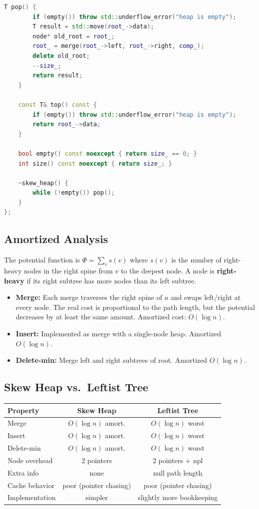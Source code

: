 \begin{lstlisting}[language=C++]
    T pop() {
        if (empty()) throw std::underflow_error("heap is empty");
        T result = std::move(root_->data);
        node* old_root = root_;
        root_ = merge(root_->left, root_->right, comp_);
        delete old_root;
        --size_;
        return result;
    }

    const T& top() const {
        if (empty()) throw std::underflow_error("heap is empty");
        return root_->data;
    }

    bool empty() const noexcept { return size_ == 0; }
    int size() const noexcept { return size_; }

    ~skew_heap() {
        while (!empty()) pop();
    }
};
\end{lstlisting}

\subsection{Amortized Analysis}

The potential function is $\Phi = \sum_v s(v)$ where $s(v)$ is the number of right-heavy nodes in the right spine from $v$ to the deepest node. A node is \textbf{right-heavy} if its right subtree has more nodes than its left subtree.

\begin{itemize}
\item \textbf{Merge:} Each merge traverses the right spine of $a$ and swaps left/right at every node. The real cost is proportional to the path length, but the potential decreases by at least the same amount. Amortized cost: $O(\log n)$.
\item \textbf{Insert:} Implemented as merge with a single-node heap. Amortized $O(\log n)$.
\item \textbf{Delete-min:} Merge left and right subtrees of root. Amortized $O(\log n)$.
\end{itemize}

\subsection{Skew Heap vs.\ Leftist Tree}

\begin{center}
\begin{tabular}{lcc}
\hline
\textbf{Property} & \textbf{Skew Heap} & \textbf{Leftist Tree} \\
\hline
Merge           & $O(\log n)$ amort. & $O(\log n)$ worst \\
Insert          & $O(\log n)$ amort. & $O(\log n)$ worst \\
Delete-min      & $O(\log n)$ amort. & $O(\log n)$ worst \\
Node overhead   & 2 pointers & 2 pointers + npl \\
Extra info      & none & null path length \\
Cache behavior  & poor (pointer chasing) & poor (pointer chasing) \\
Implementation  & simpler & slightly more bookkeeping \\
\hline
\end{tabular}
\end{center}

